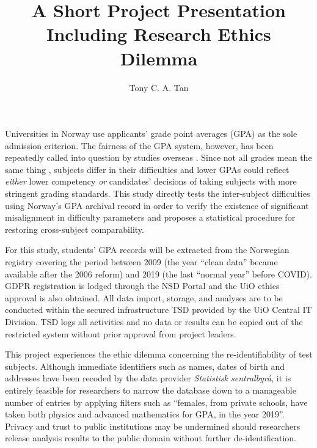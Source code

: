 \documentclass[
    a4paper,            %
    11pt,               %
    stu,                %
    noextraspace,       %
    floatsintext,       %
    biblatex,           %
    colorlinks=true,        %
    linkcolor=red,          %
    anchorcolor=black,      %
    citecolor=blue,         %
    urlcolor=blue,          %
    bookmarks=true,         %
    bookmarksopen=false,    %
    bookmarksnumbered=true  %
]{apa7}
\title{A Short Project Presentation Including Research Ethics Dilemma}
\author{Tony C. A. Tan}
\affiliation{Centre for Educational Measurement, University of Oslo}
\begin{document}
\maketitle

Universities in Norway use applicants' grade point averages (GPA) as the sole admission criterion. The fairness of the GPA system, however, has been repeatedly called into question by studies overseas \parencite{he:2018,korobko:2008}. Since not all grades mean the same thing \parencite{caulkins:1996}, subjects differ in their difficulties and lower GPAs could reflect \emph{either} lower competency \emph{or} candidates' decisions of taking subjects with more stringent grading standards. This study directly tests the inter-subject difficulties using Norway's GPA archival record in order to verify the existence of significant misalignment in difficulty parameters and proposes a statistical procedure for restoring cross-subject comparability.

For this study, students' GPA records will be extracted from the Norwegian registry covering the period between 2009 (the year ``clean data'' became available after the 2006 reform) and 2019 (the last ``normal year'' before COVID). GDPR registration is lodged through the NSD Portal and the UiO ethics approval is also obtained. All data import, storage, and analyses are to be conducted within the secured infrastructure TSD provided by the UiO Central IT Division. TSD logs all activities and no data or results can be copied out of the restricted system without prior approval from project leaders.

This project experiences the ethic dilemma concerning the re-identifiability of test subjects. Although immediate identifiers such as names, dates of birth and addresses have been recoded by the data provider \textit{Statistisk sentralbyr{\aa}}, it is entirely feasible for researchers to narrow the database down to a manageable number of entries by applying filters such as ``females, from private schools, have taken both physics and advanced mathematics for GPA, in the year 2019''. Privacy and trust to public institutions may be undermined should researchers release analysis results to the public domain without further de-identification.

\printbibliography
\end{document}
